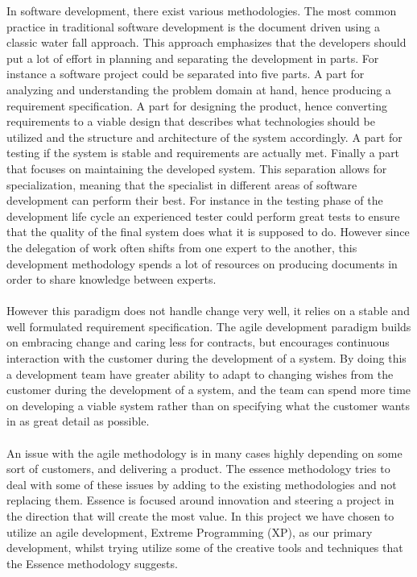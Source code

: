 In software development, there exist various methodologies. The most common practice in traditional software development is the document driven using a classic water fall approach. This approach emphasizes that the developers should put a lot of effort in planning and separating the development in parts. For instance a software project could be separated into five parts. A part for analyzing and understanding the problem domain at hand, hence producing a requirement specification. A part for designing the product, hence converting requirements to a viable design that describes what technologies should be utilized and the structure and architecture of the system accordingly. A part for testing if the system is stable and requirements are actually met. Finally a part that focuses on maintaining the developed system. This separation allows for specialization, meaning that the specialist in different areas of software development can perform their best. For instance in the testing phase of the development life cycle an experienced tester could perform great tests to ensure that the quality of the final system does what it is supposed to do. However since the delegation of work often shifts from one expert to the another, this development methodology spends a lot of resources on producing documents in order to share knowledge between experts. 
\\\\
However this paradigm does not handle change very well, it relies on a stable and well formulated requirement specification. The agile development paradigm builds on embracing change and caring less for contracts, but encourages continuous interaction with the customer during the development of a system. By doing this a development team have greater ability to adapt to changing wishes from the customer during the development of a system, and the team can spend more time on developing a viable system rather than on specifying what the customer wants in as great detail as possible.
\\\\
An issue with the agile methodology is in many cases highly depending on some sort of customers, and delivering a product. The essence methodology tries to deal with some of these issues by adding to the existing methodologies and not replacing them. Essence is focused around innovation and steering a project in the direction that will create the most value. In this project we have chosen to utilize an agile development, Extreme Programming (XP), as our primary development, whilst trying utilize some of the creative tools and techniques that the Essence methodology suggests. 





